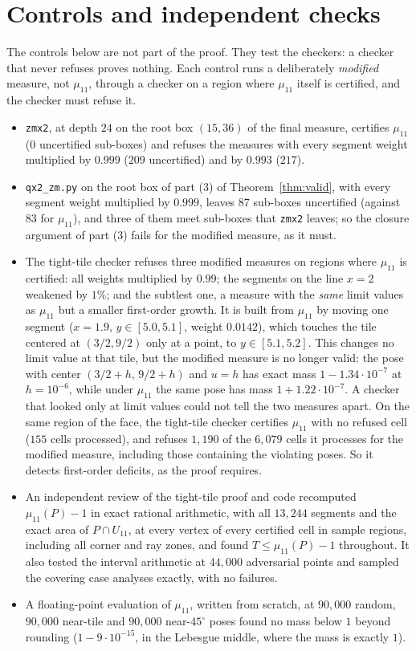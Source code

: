 \documentclass[11pt]{amsart}
\theoremstyle{definition}
\theoremstyle{remark}
\begin{document}
\section{Controls and independent checks}\label{sec:controls}

The controls below are not part of the proof. They test the checkers: a checker that never refuses proves
nothing. Each control runs a deliberately \emph{modified} measure, not $\mu_{11}$, through a checker on a region
where $\mu_{11}$ itself is certified, and the checker must refuse it.
\begin{itemize}
\item \texttt{zmx2}, at depth $24$ on the root box $(15,36)$ of the final measure, certifies $\mu_{11}$ ($0$ uncertified
sub-boxes) and refuses the measures with every segment weight multiplied by $0.999$ ($209$ uncertified) and by
$0.993$ ($217$).
\item \texttt{qx2\_zm.py} on the root box of part (3) of Theorem~\ref{thm:valid}, with every segment weight multiplied by
$0.999$, leaves $87$ sub-boxes uncertified (against $83$ for $\mu_{11}$), and three of them meet sub-boxes that
\texttt{zmx2} leaves; so the closure argument of part (3) fails for the modified measure, as it must.
\item The tight-tile checker refuses three modified measures on regions where $\mu_{11}$ is certified: all weights
multiplied by $0.99$; the segments on the line $x=2$ weakened by $1\%$; and the subtlest one, a measure with the
\emph{same} limit values as $\mu_{11}$ but a smaller first-order growth. It is built from $\mu_{11}$ by moving one
segment ($x=1.9$, $y\in[5.0,5.1]$, weight $0.0142$), which touches the tile centered at $(3/2,9/2)$ only at a
point, to $y\in[5.1,5.2]$. This changes no limit value at that tile, but the modified measure is no longer valid:
the pose with center $(3/2+h,\,9/2+h)$ and $u=h$ has exact mass $1-1.34\cdot10^{-7}$ at $h=10^{-6}$, while under
$\mu_{11}$ the same pose has mass $1+1.22\cdot10^{-7}$. A checker that looked only at limit values could not tell the
two measures apart. On the same region of the face, the tight-tile checker certifies $\mu_{11}$ with no refused cell
($155$ cells processed), and refuses $1{,}190$ of the $6{,}079$ cells it processes for the modified measure, including
those containing the violating poses. So it detects
first-order deficits, as the proof requires.
\item An independent review of the tight-tile proof and code recomputed $\mu_{11}(P)-1$ in exact rational
arithmetic, with all $13{,}244$ segments and the exact area of $P\cap U_{11}$, at every vertex of every certified cell
in sample regions, including all corner and ray zones, and found $T\le\mu_{11}(P)-1$ throughout. It also tested the
interval arithmetic at $44{,}000$ adversarial points and sampled the covering case analyses exactly, with no
failures.
\item A floating-point evaluation of $\mu_{11}$, written from scratch, at $90{,}000$ random, $90{,}000$ near-tile and
$90{,}000$ near-$45^\circ$ poses found no mass below $1$ beyond rounding ($1-9\cdot10^{-15}$, in the Lebesgue
middle, where the mass is exactly $1$).
\end{itemize}
\end{document}

